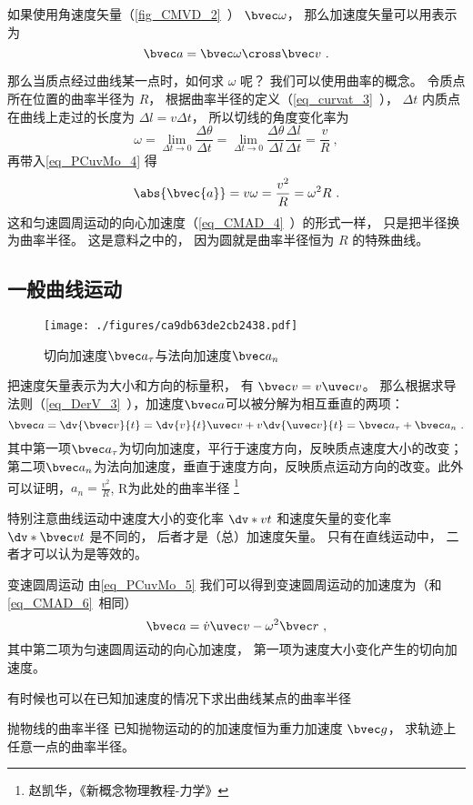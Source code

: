如果使用角速度矢量（\autoref{fig_CMVD_2}~） $\bvec \omega$， 那么加速度矢量可以用表示为
\begin{equation}
\bvec a = \bvec \omega \cross \bvec v~.
\end{equation}

那么当质点经过曲线某一点时，如何求 $\omega$ 呢？ 我们可以使用曲率的概念。 令质点所在位置的曲率半径为 $R$， 根据曲率半径的定义（\autoref{eq_curvat_3}~）， $\Delta t$ 内质点在曲线上走过的长度为 $\Delta l = v \Delta t$， 所以切线的角度变化率为
\begin{equation}
\omega = \lim_{\Delta t\to 0}\frac{\Delta \theta}{\Delta t} = \lim_{\Delta t\to 0}\frac{\Delta \theta}{\Delta l} \frac{\Delta l}{\Delta t} = \frac{v}{R}~,
\end{equation}
再带入\autoref{eq_PCuvMo_4} 得
\begin{equation}\label{eq_PCuvMo_3}
\abs{\bvec{a}} = v\omega = \frac{v^2}{R} = \omega^2 R~.
\end{equation}
这和匀速圆周运动的向心加速度（\autoref{eq_CMAD_4}~）的形式一样， 只是把半径换为曲率半径。 这是意料之中的， 因为圆就是曲率半径恒为 $R$ 的特殊曲线。

\subsection{一般曲线运动}
\begin{figure}[ht]
\centering
\texttt{[image: ./figures/ca9db63de2cb2438.pdf]}
\caption{切向加速度$\bvec a_\tau$与法向加速度$\bvec a_n$} \label{fig_PCuvMo_2}
\end{figure}
把速度矢量表示为大小和方向的标量积， 有 $\bvec v = v\uvec v$。 那么根据求导法则（\autoref{eq_DerV_3}~），加速度$\bvec a$可以被分解为相互垂直的两项：
\begin{equation}\label{eq_PCuvMo_5}
\bvec a = \dv{\bvec v}{t} = \dv{v}{t}\uvec v + v\dv{\uvec v}{t} = \bvec a_{\tau}+\bvec a_n~.
\end{equation}
其中第一项$\bvec a_{\tau}$为切向加速度，平行于速度方向，反映质点速度大小的改变；第二项$\bvec a_n$为法向加速度，垂直于速度方向，反映质点运动方向的改变。此外可以证明，$a_n=\frac{v^2}{R}$, R为此处的曲率半径 \footnote{赵凯华，《新概念物理教程-力学》}

特别注意曲线运动中速度大小的变化率 $\dv*{v}{t}$ 和速度矢量的变化率 $\dv*{\bvec v}{t}$ 是不同的， 后者才是（总）加速度矢量。 只有在直线运动中， 二者才可以认为是等效的。

\begin{example}{变速圆周运动}\label{ex_PCuvMo_1}
由\autoref{eq_PCuvMo_5} 我们可以得到变速圆周运动的加速度为（和\autoref{eq_CMAD_6}~相同）
\begin{equation}
\bvec a = \dot v \uvec v - \omega ^2 \bvec r~,
\end{equation}
其中第二项为匀速圆周运动的向心加速度， 第一项为速度大小变化产生的切向加速度。
\end{example}

有时候也可以在已知加速度的情况下求出曲线某点的曲率半径
\begin{exercise}{抛物线的曲率半径}
已知抛物运动的的加速度恒为重力加速度 $\bvec g$， 求轨迹上任意一点的曲率半径。
\end{exercise}
